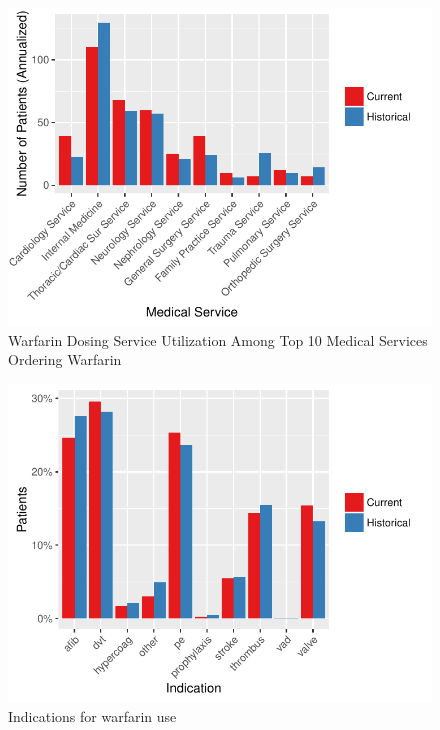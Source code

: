 \documentclass[]{article}
\begin{document}
\begin{figure}[H]
\centering
\includegraphics{warfarin_analysis_ASHP_files/figure-latex/ds_med_service-1.pdf}
\caption{Warfarin Dosing Service Utilization Among Top 10 Medical
Services Ordering Warfarin}
\end{figure}

\begin{figure}[H]
\centering
\includegraphics{warfarin_analysis_ASHP_files/figure-latex/indications_hist-1.pdf}
\caption{Indications for warfarin use}
\end{figure}
\end{document}
